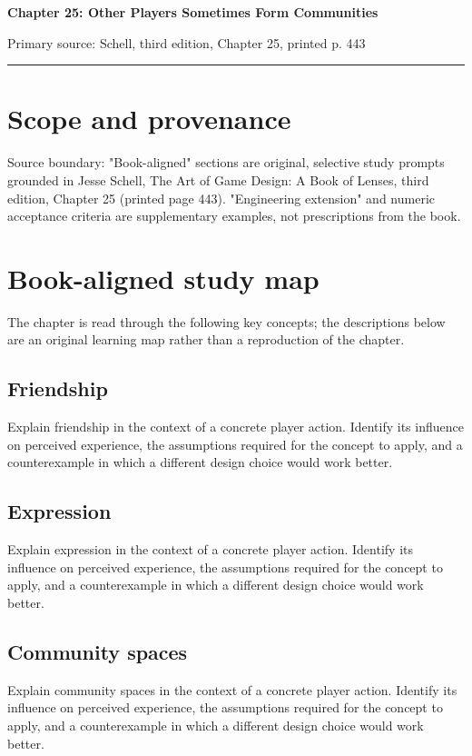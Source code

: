 \documentclass[11pt]{article}
\begin{document}
{\huge\bfseries\color{suiteblue} Chapter 25: Other Players Sometimes Form Communities}\par
\vspace{0.15in}
{\normalsize\color{suitegray} Primary source: Schell, third edition, Chapter 25, printed p. 443}\par
\vspace{0.15in}\hrule\vspace{0.15in}

\section{Scope and provenance}
Source boundary: "Book-aligned" sections are original, selective study prompts grounded in Jesse Schell, The Art of Game Design: A Book of Lenses, third edition, Chapter 25 (printed page 443). "Engineering extension" and numeric acceptance criteria are supplementary examples, not prescriptions from the book.


\section{Book-aligned study map}
The chapter is read through the following key concepts; the descriptions below are an original learning map rather than a reproduction of the chapter.


\subsection{Friendship}
Explain friendship in the context of a concrete player action. Identify its influence on perceived experience, the assumptions required for the concept to apply, and a counterexample in which a different design choice would work better.


\subsection{Expression}
Explain expression in the context of a concrete player action. Identify its influence on perceived experience, the assumptions required for the concept to apply, and a counterexample in which a different design choice would work better.


\subsection{Community spaces}
Explain community spaces in the context of a concrete player action. Identify its influence on perceived experience, the assumptions required for the concept to apply, and a counterexample in which a different design choice would work better.
\end{document}
